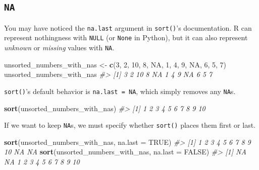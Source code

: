 \documentclass[
]{report}
\newenvironment{Shaded}{\begin{snugshade}}{\end{snugshade}}
\newcommand{\CommentTok}[1]{\textcolor[rgb]{0.56,0.35,0.01}{\textit{#1}}}
\newcommand{\DataTypeTok}[1]{\textcolor[rgb]{0.13,0.29,0.53}{#1}}
\newcommand{\DecValTok}[1]{\textcolor[rgb]{0.00,0.00,0.81}{#1}}
\newcommand{\KeywordTok}[1]{\textcolor[rgb]{0.13,0.29,0.53}{\textbf{#1}}}
\newcommand{\NormalTok}[1]{#1}
\newcommand{\OtherTok}[1]{\textcolor[rgb]{0.56,0.35,0.01}{#1}}
\newcommand{\StringTok}[1]{\textcolor[rgb]{0.31,0.60,0.02}{#1}}
\begin{document}
\hypertarget{na}{%
\subsection{\texorpdfstring{\texttt{NA}}{NA}}\label{na}}

You may have noticed the \texttt{na.last} argument in \texttt{sort()}'s documentation. R can represent nothingness with \texttt{NULL} (or \texttt{None} in Python), but it can also represent \emph{unknown} or \emph{missing} values with \texttt{NA}.

\begin{Shaded}
\begin{Highlighting}[]
\NormalTok{unsorted\_numbers\_with\_nas \textless{}{-}}\StringTok{ }\KeywordTok{c}\NormalTok{(}\DecValTok{3}\NormalTok{, }\DecValTok{2}\NormalTok{, }\DecValTok{10}\NormalTok{, }\DecValTok{8}\NormalTok{, }\OtherTok{NA}\NormalTok{, }\DecValTok{1}\NormalTok{, }\DecValTok{4}\NormalTok{, }\DecValTok{9}\NormalTok{, }\OtherTok{NA}\NormalTok{, }\DecValTok{6}\NormalTok{, }\DecValTok{5}\NormalTok{, }\DecValTok{7}\NormalTok{)}
\NormalTok{unsorted\_numbers\_with\_nas}
\CommentTok{\#\textgreater{}  [1]  3  2 10  8 NA  1  4  9 NA  6  5  7}
\end{Highlighting}
\end{Shaded}

\texttt{sort()}'s default behavior is \texttt{na.last\ =\ NA}, which simply removes any \texttt{NA}s.

\begin{Shaded}
\begin{Highlighting}[]
\KeywordTok{sort}\NormalTok{(unsorted\_numbers\_with\_nas)}
\CommentTok{\#\textgreater{}  [1]  1  2  3  4  5  6  7  8  9 10}
\end{Highlighting}
\end{Shaded}

If we want to keep \texttt{NA}s, we must specify whether \texttt{sort()} places them first or last.

\begin{Shaded}
\begin{Highlighting}[]
\KeywordTok{sort}\NormalTok{(unsorted\_numbers\_with\_nas, }\DataTypeTok{na.last =} \OtherTok{TRUE}\NormalTok{)}
\CommentTok{\#\textgreater{}  [1]  1  2  3  4  5  6  7  8  9 10 NA NA}
\KeywordTok{sort}\NormalTok{(unsorted\_numbers\_with\_nas, }\DataTypeTok{na.last =} \OtherTok{FALSE}\NormalTok{)}
\CommentTok{\#\textgreater{}  [1] NA NA  1  2  3  4  5  6  7  8  9 10}
\end{Highlighting}
\end{Shaded}
\end{document}
